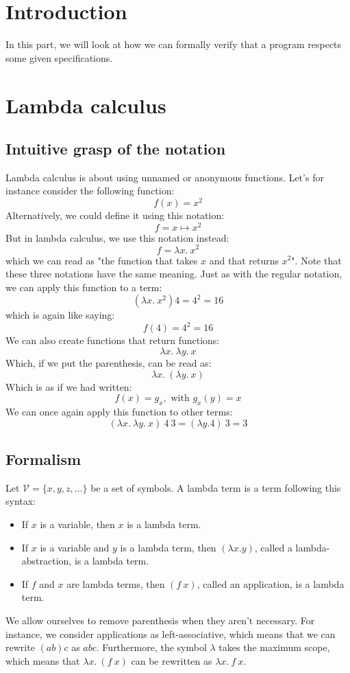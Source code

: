 
\section{Introduction}

In this part, we will look at how we can formally verify that a program respects some given specifications.

\section{Lambda calculus}

\subsection{Intuitive grasp of the notation}

Lambda calculus is about using unnamed or anonymous functions. Let's for instance consider the following function:
    $$f(x) = x^2$$
Alternatively, we could define it using this notation:
    $$f = x \mapsto x^2$$
But in lambda calculus, we use this notation instead:
    $$f = \lambda x.\ x^2$$
which we can read as "the function that takes $x$ and that returns $x^2$". Note that these three notations have the same meaning. Just as with the regular notation, we can apply this function to a term:
    $$(\lambda x.\ x^2) 4 = 4^2 = 16$$
which is again like saying:
    $$f(4) = 4^2 = 16$$
We can also create functions that return functions:
    $$\lambda x.\ \lambda y.\ x$$
Which, if we put the parenthesis, can be read as:
    $$\lambda x.\ (\lambda y.\ x)$$
Which is as if we had written:
    $$f(x) = g_x, \text{ with } g_x(y) = x$$
We can once again apply this function to other terms:
    $$(\lambda x.\ \lambda y.\ x)\ 4\ 3 = (\lambda y. 4)\ 3 = 3$$


\subsection{Formalism}

\begin{definition}
    Let $\mathcal{V} = \{x, y, z, \dots\}$ be a set of symbols. A lambda term is a term following this syntax:
    \begin{itemize}
        \item If $x$ is a variable, then $x$ is a lambda term.
        \item If $x$ is a variable and $y$ is a lambda term, then $(\lambda x. y)$, called a lambda-abstraction, is a lambda term.
        \item If $f$ and $x$ are lambda terms, then $(f\ x)$, called an application, is a lambda term.
    \end{itemize}
    We allow ourselves to remove parenthesis when they aren't necessary. For instance, we consider applications as left-associative, which means that we can rewrite $(a b) c$ as $a b c$. Furthermore, the symbol $\lambda$ takes the maximum scope, which means that $\lambda x.\ (f\ x)$ can be rewritten as $\lambda x.\ f\ x$.
\end{definition}


